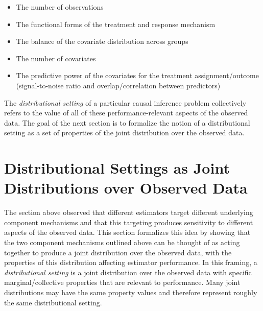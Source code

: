 \documentclass[../main.tex]{subfiles}
\begin{document}
\vspace{\baselineskip}
\begin{itemize}
    \item The number of observations\par

    \item The functional forms of the treatment and response mechanism\par

    \item The balance of the covariate distribution across groups\par

    \item The number of covariates\par

    \item The predictive power of the covariates for the treatment assignment/outcome (signal-to-noise ratio and overlap/correlation between predictors)
\end{itemize}\par


\vspace{\baselineskip}
The \textit{distributional setting} of a particular causal inference problem collectively refers to the value of all of these performance-relevant aspects of the observed data. The goal of the next section is to formalize the notion of a distributional setting as a set of properties of the joint distribution over the observed data.

\section{Distributional Settings as Joint Distributions over Observed Data}
\label{sec:distro-setting-as-joint}

\vspace{\baselineskip}
The section above observed that different estimators target different underlying component mechanisms and that this targeting produces sensitivity to different aspects of the observed data. This section formalizes this idea by showing that the two component mechanisms outlined above can be thought of as acting together to produce a joint distribution over the observed data, with the properties of this distribution affecting estimator performance. In this framing, a \textit{distributional setting }is a joint distribution over the observed data with specific marginal/collective properties that are relevant to performance. Many joint distributions may have the same property values and therefore represent roughly the same distributional setting.\par
\end{document}
